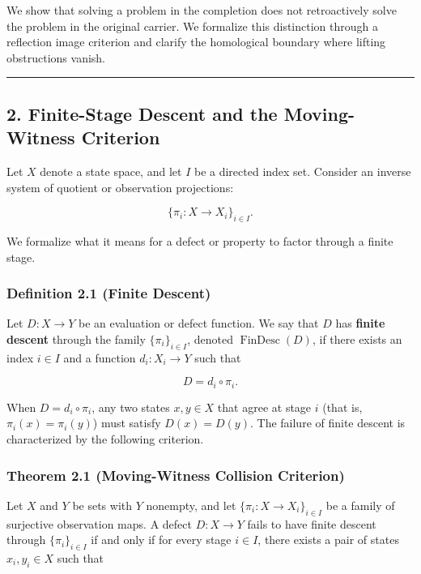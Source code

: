 \documentclass[
  11pt,
]{article}
\theoremstyle{plain}
\theoremstyle{definition}\newtheorem{definition}[theorem]{Definition}
\theoremstyle{remark}\newtheorem*{remark}{Remark}
\begin{document}
We show that solving a problem in the completion does not retroactively
solve the problem in the original carrier. We formalize this distinction
through a reflection image criterion and clarify the homological
boundary where lifting obstructions vanish.

\begin{center}\rule{0.5\linewidth}{0.5pt}\end{center}

\subsection{2. Finite-Stage Descent and the Moving-Witness
Criterion}\label{finite-stage-descent-and-the-moving-witness-criterion}

Let \(X\) denote a state space, and let \(I\) be a directed index set.
Consider an inverse system of quotient or observation projections:

\[
\{\pi_i: X \longrightarrow X_i\}_{i \in I}.
\]

We formalize what it means for a defect or property to factor through a
finite stage.

\subsubsection{Definition 2.1 (Finite
Descent)}\label{definition-2.1-finite-descent}

Let \(D: X \to Y\) be an evaluation or defect function. We say that
\(D\) has \textbf{finite descent} through the family
\(\{\pi_i\}_{i \in I}\), denoted \(\operatorname{FinDesc}(D)\), if there
exists an index \(i \in I\) and a function \(d_i: X_i \to Y\) such that

\[
D = d_i \circ \pi_i.
\]

When \(D = d_i \circ \pi_i\), any two states \(x, y \in X\) that agree
at stage \(i\) (that is, \(\pi_i(x) = \pi_i(y)\)) must satisfy
\(D(x) = D(y)\). The failure of finite descent is characterized by the
following criterion.

\subsubsection{Theorem 2.1 (Moving-Witness Collision
Criterion)}\label{theorem-2.1-moving-witness-collision-criterion}

Let \(X\) and \(Y\) be sets with \(Y\) nonempty, and let
\(\{\pi_i: X \to X_i\}_{i \in I}\) be a family of surjective observation
maps. A defect \(D: X \to Y\) fails to have finite descent through
\(\{\pi_i\}_{i \in I}\) if and only if for every stage \(i \in I\),
there exists a pair of states \(x_i, y_i \in X\) such that
\end{document}
